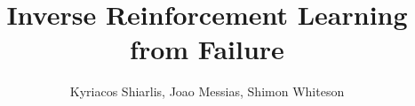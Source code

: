 \documentclass[conference]{IEEEtran}
\begin{document}
\title{Inverse Reinforcement Learning from Failure}

\author{Kyriacos Shiarlis, Joao Messias, Shimon Whiteson}





% 


\maketitle
\end{document}
